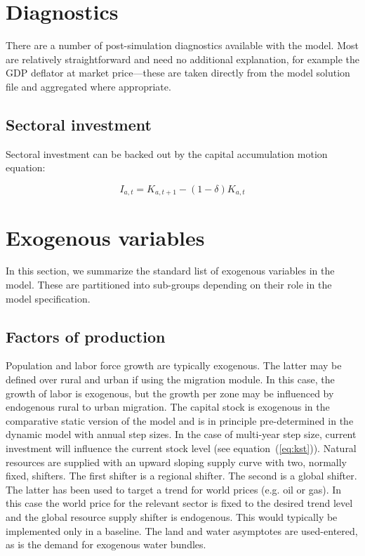 \documentclass[11pt,letterpaper]{report}
\begin{document}
\section{Diagnostics}

There are a number of post-simulation diagnostics available with the model. Most
are relatively straightforward and need no additional explanation, for example
the GDP deflator at market price---these are taken directly from the model
solution file and aggregated where appropriate.

\subsection{Sectoral investment}

Sectoral investment can be backed out by the capital accumulation motion
equation:

\[
I_{a,t} = K_{a,t+1} - (1-\delta)K_{a,t}
\]

\section{Exogenous variables}

In this section, we summarize the standard list of
exogenous variables in the model. These are partitioned
into sub-groups depending on their role in the model
specification.

\subsection{Factors of production}

Population and labor force growth are typically exogenous. The latter
may be defined over rural and urban if using the migration module. In
this case, the growth of labor is exogenous, but the growth per zone
may be influenced by endogenous rural to urban migration. The capital
stock is exogenous in the comparative static version of the model
and is in principle pre-determined in the dynamic model with annual
step sizes. In the case of multi-year step size, current investment
will influence the current stock level (see equation~(\ref{eq:kst})).
Natural resources are supplied with an upward sloping supply curve
with two, normally fixed, shifters. The first shifter is a regional
shifter. The second is a global shifter. The latter has been used to
target a trend for world prices (e.g. oil or gas). In this case
the world price for the relevant sector is fixed to the desired
trend level and the global resource supply shifter is endogenous. This
would typically be implemented only in a baseline. The land
and water asymptotes are used-entered, as is the demand for
exogenous water bundles.
\end{document}
